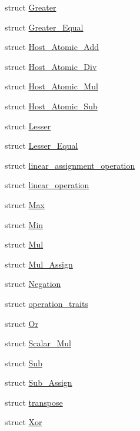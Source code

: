 \begin{DoxyCompactItemize}
\item 
struct \hyperlink{structbc_1_1oper_1_1Greater}{Greater}
\item 
struct \hyperlink{structbc_1_1oper_1_1Greater__Equal}{Greater\+\_\+\+Equal}
\item 
struct \hyperlink{structbc_1_1oper_1_1Host__Atomic__Add}{Host\+\_\+\+Atomic\+\_\+\+Add}
\item 
struct \hyperlink{structbc_1_1oper_1_1Host__Atomic__Div}{Host\+\_\+\+Atomic\+\_\+\+Div}
\item 
struct \hyperlink{structbc_1_1oper_1_1Host__Atomic__Mul}{Host\+\_\+\+Atomic\+\_\+\+Mul}
\item 
struct \hyperlink{structbc_1_1oper_1_1Host__Atomic__Sub}{Host\+\_\+\+Atomic\+\_\+\+Sub}
\item 
struct \hyperlink{structbc_1_1oper_1_1Lesser}{Lesser}
\item 
struct \hyperlink{structbc_1_1oper_1_1Lesser__Equal}{Lesser\+\_\+\+Equal}
\item 
struct \hyperlink{structbc_1_1oper_1_1linear__assignment__operation}{linear\+\_\+assignment\+\_\+operation}
\item 
struct \hyperlink{structbc_1_1oper_1_1linear__operation}{linear\+\_\+operation}
\item 
struct \hyperlink{structbc_1_1oper_1_1Max}{Max}
\item 
struct \hyperlink{structbc_1_1oper_1_1Min}{Min}
\item 
struct \hyperlink{structbc_1_1oper_1_1Mul}{Mul}
\item 
struct \hyperlink{structbc_1_1oper_1_1Mul__Assign}{Mul\+\_\+\+Assign}
\item 
struct \hyperlink{structbc_1_1oper_1_1Negation}{Negation}
\item 
struct \hyperlink{structbc_1_1oper_1_1operation__traits}{operation\+\_\+traits}
\item 
struct \hyperlink{structbc_1_1oper_1_1Or}{Or}
\item 
struct \hyperlink{structbc_1_1oper_1_1Scalar__Mul}{Scalar\+\_\+\+Mul}
\item 
struct \hyperlink{structbc_1_1oper_1_1Sub}{Sub}
\item 
struct \hyperlink{structbc_1_1oper_1_1Sub__Assign}{Sub\+\_\+\+Assign}
\item 
struct \hyperlink{structbc_1_1oper_1_1transpose}{transpose}
\item 
struct \hyperlink{structbc_1_1oper_1_1Xor}{Xor}
\end{DoxyCompactItemize}
